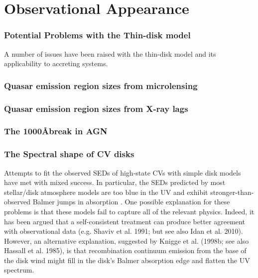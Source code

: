 \section{Observational Appearance}



\subsubsection{Potential Problems with the Thin-disk model}

A number of issues have been raised with the thin-disk model and
its applicability to accreting systems. 

\subsubsection{Quasar emission region sizes from microlensing}

\subsubsection{Quasar emission region sizes from X-ray lags}

\subsubsection{The 1000\AA break in AGN}



\subsubsection{The Spectral shape of CV disks}

Attempts to fit the observed SEDs of high-state CVs with simple disk models have met with mixed success. In
particular, the SEDs predicted by most stellar/disk atmosphere models 
are too blue in the UV \citep{wade1988,long1991,long1994,knigge1998} and exhibit
stronger-than-observed Balmer jumps in absorption 
\citep{wade1984,haug1987,ladous1989b,knigge1998}. One possible
explanation for these problems is that these models fail to capture
all of the relevant physics. Indeed, it has been argued that a
self-consistent treatment can produce better agreement with 
observational data (e.g. Shaviv et al. 1991;  but see also Idan et al. 2010).
\nocite{idanshaviv2010} \nocite{shaviv1991}
However, an alternative explanation, suggested by Knigge et al.
(1998b; see also Hassall et al. 1985)\nocite{KLWB98,hassall}, 
is that recombination continuum emission from the base of the 
disk wind might fill in the disk's Balmer absorption edge and flatten the UV spectrum.

